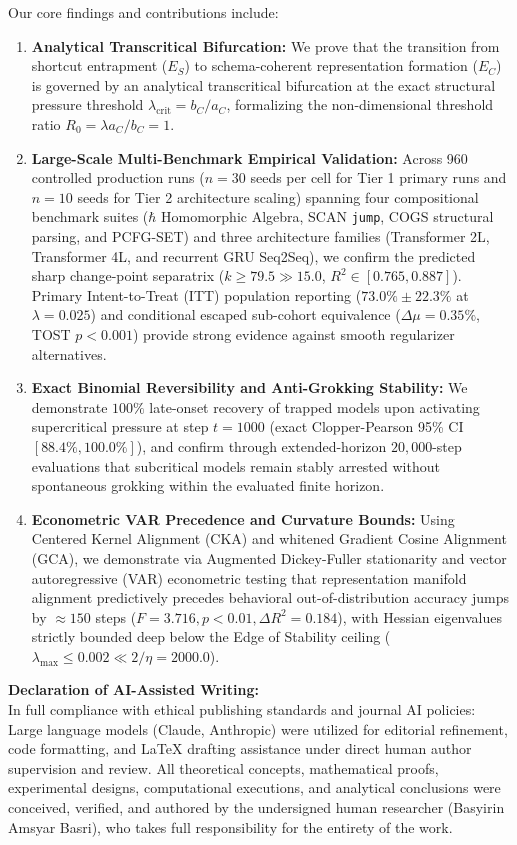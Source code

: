 \documentclass[11pt]{article}
\begin{document}
Our core findings and contributions include:
\begin{enumerate}
    \item \textbf{Analytical Transcritical Bifurcation:} We prove that the transition from shortcut entrapment ($E_S$) to schema-coherent representation formation ($E_C$) is governed by an analytical transcritical bifurcation at the exact structural pressure threshold $\lambda_{\text{crit}} = b_C / a_C$, formalizing the non-dimensional threshold ratio $R_0 = \lambda a_C / b_C = 1$.
    \item \textbf{Large-Scale Multi-Benchmark Empirical Validation:} Across 960 controlled production runs ($n=30$ seeds per cell for Tier 1 primary runs and $n=10$ seeds for Tier 2 architecture scaling) spanning four compositional benchmark suites ($\hbar$ Homomorphic Algebra, SCAN \texttt{jump}, COGS structural parsing, and PCFG-SET) and three architecture families (Transformer 2L, Transformer 4L, and recurrent GRU Seq2Seq), we confirm the predicted sharp change-point separatrix ($k \ge 79.5 \gg 15.0$, $R^2 \in [0.765, 0.887]$). Primary Intent-to-Treat (ITT) population reporting ($73.0\% \pm 22.3\%$ at $\lambda=0.025$) and conditional escaped sub-cohort equivalence ($\Delta \mu = 0.35\%$, TOST $p < 0.001$) provide strong evidence against smooth regularizer alternatives.
    \item \textbf{Exact Binomial Reversibility and Anti-Grokking Stability:} We demonstrate $100\%$ late-onset recovery of trapped models upon activating supercritical pressure at step $t=1000$ (exact Clopper-Pearson 95\% CI $[88.4\%, 100.0\%]$), and confirm through extended-horizon $20{,}000$-step evaluations that subcritical models remain stably arrested without spontaneous grokking within the evaluated finite horizon.
    \item \textbf{Econometric VAR Precedence and Curvature Bounds:} Using Centered Kernel Alignment (CKA) and whitened Gradient Cosine Alignment (GCA), we demonstrate via Augmented Dickey-Fuller stationarity and vector autoregressive (VAR) econometric testing that representation manifold alignment predictively precedes behavioral out-of-distribution accuracy jumps by $\approx 150$ steps ($F = 3.716, p < 0.01, \Delta R^2 = 0.184$), with Hessian eigenvalues strictly bounded deep below the Edge of Stability ceiling ($\lambda_{\text{max}} \le 0.002 \ll 2/\eta = 2000.0$).
\end{enumerate}

\vspace{0.8em}
\noindent
\textbf{Declaration of AI-Assisted Writing:} \\
In full compliance with ethical publishing standards and journal AI policies: Large language models (Claude, Anthropic) were utilized for editorial refinement, code formatting, and \LaTeX{} drafting assistance under direct human author supervision and review. All theoretical concepts, mathematical proofs, experimental designs, computational executions, and analytical conclusions were conceived, verified, and authored by the undersigned human researcher (Basyirin Amsyar Basri), who takes full responsibility for the entirety of the work.
\end{document}
